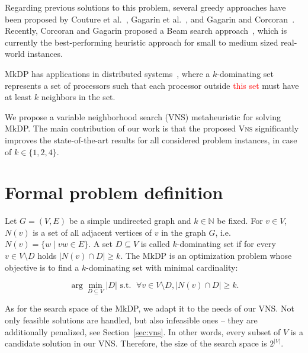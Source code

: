 \documentclass[dvipsnames,format=sigconf]{acmart} %
\begin{document}
Regarding previous solutions to this problem, several greedy approaches have been proposed by Couture et al.~\cite{couture2006incremental}, Gagarin et al.~\cite{gagarin2013randomized}, and Gagarin and Corcoran~\cite{gagarin2018multiple}. Recently, Corcoran and Gagarin proposed a Beam search approach~\cite{corcoran2021heuristics}, which is currently the best-performing heuristic approach for small to medium sized real-world instances. 
 
MkDP has applications in distributed systems~\cite{wang2013minimising}, where a $k$-dominating set {\color{red}represents} a set of processors such that each processor outside \textcolor{red}{this set} must have at least $k$ neighbors in the set.

We propose a variable neighborhood search (VNS) metaheuristic for solving MkDP. {\color{red}The main contribution of our work is that the proposed \textsc{Vns}} significantly improves the state-of-the-art results for all considered problem instances, in case of $k \in \{1, 2, 4\}$.  %

\section{Formal problem definition }
    
Let $G=(V,E)$ be a simple undirected graph and $k \in \mathbb{N}$ be fixed. For $v\in V$, $N(v)$ is a set of all adjacent vertices of $v$ in the graph $G$, i.e. $N(v)=\{w \mid vw \in E\}$. A set $D \subseteq V$ is called $k$-dominating set if for every $v\in V \setminus D$ holds $|N(v) \cap D| \geq k$. The MkDP is an optimization problem whose objective is to find a $k$-dominating set with minimal cardinality:

\begin{equation}
\arg \min_{D \subseteq V } |D|
  	\mbox{  s.t. } \; \forall v \in V \setminus D, |N(v) \cap D| \geq k.
\end{equation}
    
As for the search space of the MkDP, we adapt it to the needs of our VNS. Not only feasible solutions are handled, but also infeasible ones -- they are additionally penalized, see Section~\ref{sec:vns}. In other words, every subset of $V$ is a candidate solution in our VNS. Therefore, the size of the search space is $2^{|V|}$. 
   
\end{document}
